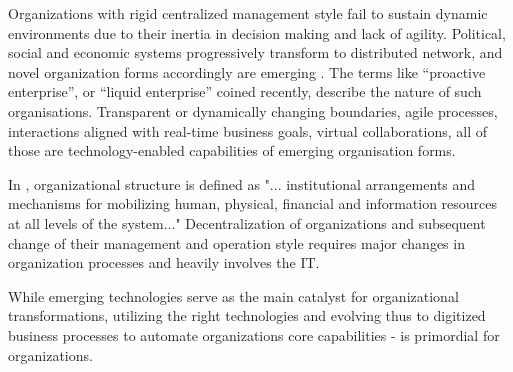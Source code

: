 Organizations with rigid centralized management style fail to sustain dynamic environments due to their inertia in decision making and lack of agility. Political, social and economic systems progressively transform to distributed network, and novel organization forms accordingly are emerging \cite{bowens}. The terms like “proactive enterprise”, or “liquid enterprise” coined recently, describe  the nature of such organisations. Transparent or dynamically changing boundaries, agile processes, interactions aligned with real-time business goals, virtual collaborations, all of those are technology-enabled capabilities of emerging organisation forms.

In \cite{sachdeva1990}, organizational structure is defined as "... institutional arrangements and mechanisms for mobilizing human, physical, financial and information resources at all levels of the system..." Decentralization of organizations and subsequent change
of their management and operation style requires major changes in organization processes and heavily involves the IT.



 While emerging technologies serve as the main catalyst for organizational transformations, utilizing the right technologies and evolving thus to digitized business processes to automate organizations core capabilities \cite{ross2006} - is primordial for organizations. 

